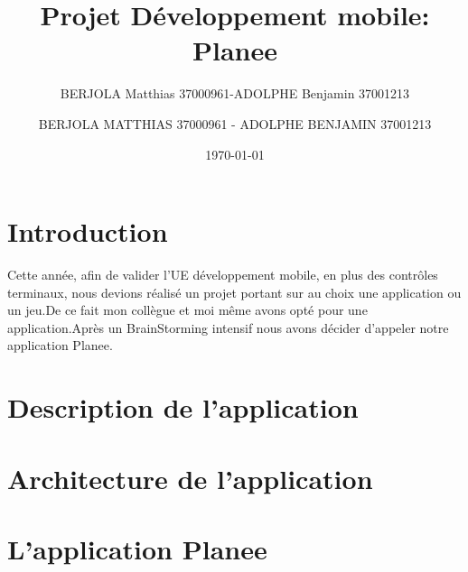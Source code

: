 \documentclass[12pt,a4paper]{report}
\author{BERJOLA Matthias 37000961-ADOLPHE Benjamin 37001213}           %
\begin{document}
\title{Projet Développement mobile: Planee}
\author{BERJOLA MATTHIAS 37000961 - ADOLPHE BENJAMIN 37001213}
\date{\today} 

\maketitle


\newpage

\tableofcontents



    
\chapter{Introduction}  





\begin{flushleft}
{\Large Cette année, afin de valider l'UE développement mobile, en plus des contrôles terminaux, nous devions réalisé un projet portant sur au choix une application ou un jeu.De ce fait mon collègue et moi même avons opté pour une application.Après un BrainStorming intensif nous avons décider d'appeler notre application Planee.}
\end{flushleft}





\newpage
\chapter{Description de l'application}


\newpage
\chapter{Architecture de l'application}


\newpage

\chapter{L'application Planee}
\end{document}
